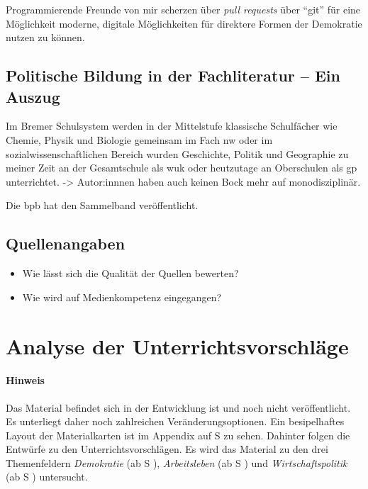 Programmierende Freunde von mir scherzen über \emph{pull requests} über \enquote{git} für eine Möglichkeit moderne, digitale Möglichkeiten für direktere Formen der Demokratie nutzen zu können.





\subsection{Politische Bildung in der Fachliteratur -- Ein Auszug}
Im Bremer Schulsystem werden in der Mittelstufe klassische Schulfächer wie Chemie, Physik und Biologie gemeinsam im Fach \gls{nw} \autocite{vogel2010nw} oder im sozialwissenschaftlichen Bereich wurden Geschichte, Politik und Geographie zu meiner Zeit an der Gesamtschule als \gls{wuk} \autocite{vogel2006gs} oder heutzutage an Oberschulen als \gls{gp} \autocite{vogel2010gp} unterrichtet.
->
Autor:innnen haben auch keinen Bock mehr auf monodisziplinär. 

Die \gls{bpb} hat den Sammelband veröffentlicht.
\subsection{Quellenangaben}
\begin{itemize}
    \item Wie lässt sich die Qualität der Quellen bewerten?
    \item Wie wird auf Medienkompetenz eingegangen?
 \end{itemize}




\section{Analyse der Unterrichtsvorschläge \label{Analyse}}
\paragraph{Hinweis}
Das Material befindet sich in der Entwicklung ist und noch nicht veröffentlicht. Es unterliegt daher noch zahlreichen Veränderungsoptionen. 
Ein besipelhaftes Layout der Materialkarten ist im Appendix auf \acrlong{S} \pageref{ANKPrototyp} zu sehen. Dahinter folgen die Entwürfe zu den Unterrichtsvorschlägen.
Es wird das Material zu den drei Themenfeldern \emph{Demokratie} (ab \gls{S} \pageref{DEMOKRATIE-A1}), \emph{Arbeitsleben} (ab \gls{S} \pageref{ARBEITSLEBEN-A1}) und \emph{Wirtschaftspolitik} (ab \gls{S} \pageref{WIRTSCHAFTSPOLITIK-A1}) untersucht. \\


